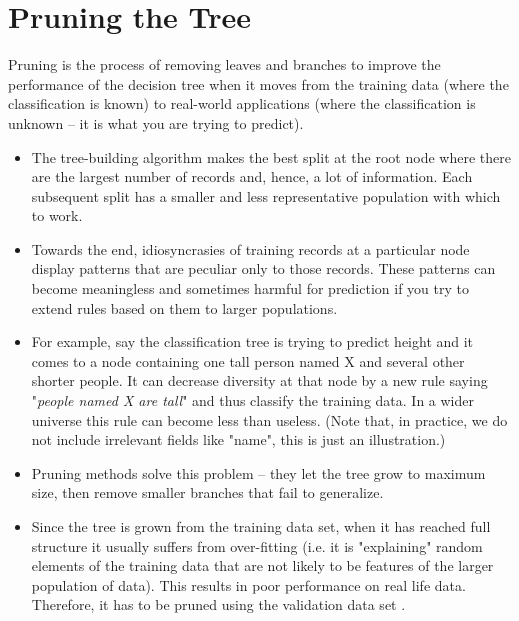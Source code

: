 \documentclass[caret-main.tex]{subfiles}
\begin{document}
\section*{Pruning the Tree}
\begin{framed}
\noindent Pruning is the process of removing leaves and branches to improve the performance of the decision tree when it moves from the training data (where the classification is known) to real-world applications (where the classification is unknown -- it is what you are trying to predict). 
\end{framed}
\begin{itemize}

\item The tree-building algorithm makes the best split at the root node where there are the largest number of records and, hence, a lot of information. Each subsequent split has a smaller and less representative population with which to work. 
\item Towards the end, idiosyncrasies of training records at a particular node display patterns that are peculiar only to those records. These patterns can become meaningless and sometimes harmful for prediction if you try to extend rules based on them to larger populations.

\item For example, say the classification tree is trying to predict height and it comes to a node containing one tall person named X and several other shorter people. It can decrease diversity at that node by a new rule saying "\textit{people named X are tall}" and thus classify the training data. In a wider universe this rule can become less than useless. (Note that, in practice, we do not include irrelevant fields like "name", this is just an illustration.)

\item Pruning methods solve this problem -- they let the tree grow to maximum size, then remove smaller branches that fail to generalize.

\item Since the tree is grown from the training data set, when it has reached full structure it usually suffers from over-fitting (i.e. it is "explaining" random elements of the training data that are not likely to be features of the larger population of data). This results in poor performance on real life data. Therefore, it has to be pruned using the validation data set .
\end{itemize}
\end{document}
